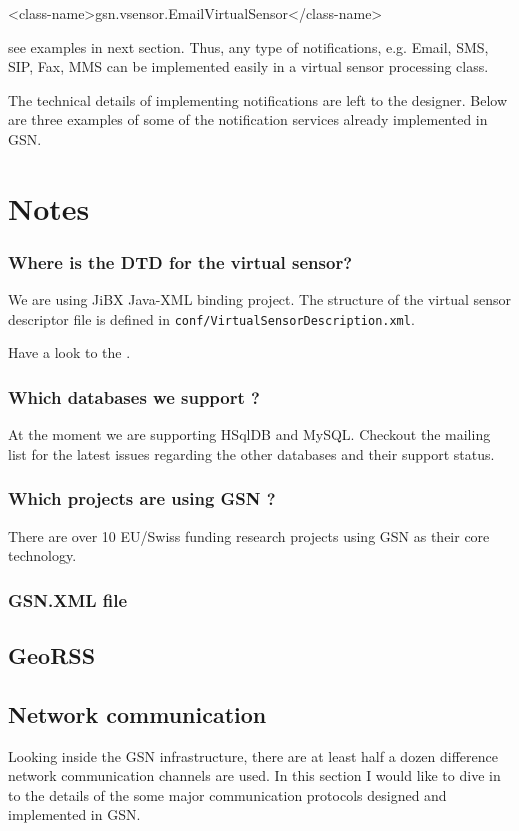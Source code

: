 \begin{xmlcode}
<class-name>gsn.vsensor.EmailVirtualSensor</class-name>
\end{xmlcode}

see examples in next section. Thus, any type of notifications, e.g. Email, SMS, SIP, Fax, MMS can be implemented easily in a virtual sensor processing class. 

The technical details of implementing notifications are left to the designer. Below are three examples of some of the notification services already implemented in GSN.


\section{Notes}


\subsubsection{Where is the DTD for the virtual sensor?}
We are using JiBX Java-XML binding project. The structure of the virtual sensor descriptor file is defined in \texttt{conf/VirtualSensorDescription.xml}.

Have a look to the .

\subsubsection{Which databases we support ?}
At the moment we are supporting HSqlDB and MySQL. Checkout the mailing list for the latest issues regarding the other databases and their
support status.
\subsubsection{Which projects are using GSN ?}
There are over 10 EU/Swiss funding research projects using GSN as their core technology.
\subsubsection{GSN.XML file}
\subsection{GeoRSS}
\subsection{Network communication}
Looking inside the GSN infrastructure, there are at least half a dozen difference network communication channels are used. In this section I would like to dive in to the details
of the some major communication protocols designed and implemented in GSN. 

